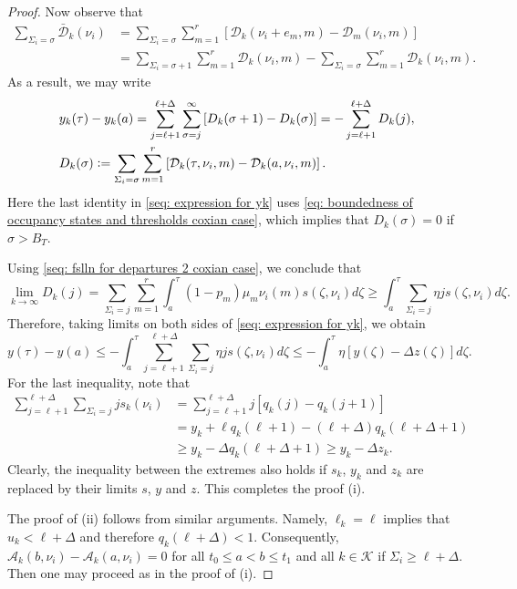\documentclass[a4paper, 12pt]{article}
\theoremstyle{definition}
\newcommand{\defeq}{\vcentcolon=}
\newcommand{\calA}{\mathcal{A}}
\newcommand{\calD}{\mathcal{D}}
\newcommand{\calK}{\mathcal{K}}
\begin{document}
\begin{proof}
Now observe that
\begin{align*}
	\sum_{\Sigma_i = \sigma} \bar{\calD}_k(\nu_i) &= \sum_{\Sigma_i = \sigma} \sum_{m = 1}^r \left[\calD_k(\nu_i + e_m, m) - \calD_m(\nu_i, m)\right] \\
	&= \sum_{\Sigma_i = \sigma + 1} \sum_{m = 1}^r \calD_k(\nu_i, m) - \sum_{\Sigma_i = \sigma} \sum_{m = 1}^r \calD_k(\nu_i, m).
\end{align*}
As a result, we may write
\begin{subequations}
	\begin{align}
		&y_k(\tau) - y_k(a) = \sum_{j = \ell + 1}^{\ell + \Delta} \sum_{\sigma = j}^\infty \left[D_k(\sigma + 1) - D_k(\sigma)\right] = - \sum_{j = \ell + 1}^{\ell + \Delta} D_k(j), \label{seq: expression for yk}\\
		&D_k(\sigma) \defeq \sum_{\Sigma_i = \sigma} \sum_{m = 1}^r \left[\calD_k(\tau, \nu_i, m) - \calD_k(a, \nu_i, m)\right].
	\end{align}
\end{subequations}
Here the last identity in \eqref{seq: expression for yk} uses \eqref{eq: boundedness of occupancy states and thresholds coxian case}, which implies that $D_k(\sigma) = 0$ if $\sigma > B_T$.

Using \eqref{seq: fslln for departures 2 coxian case}, we conclude that
\begin{equation*}
	\lim_{k \to \infty} D_k(j) = \sum_{\Sigma_i = j} \sum_{m = 1}^r \int_a^\tau (1 - p_m)\mu_m\nu_i(m)s(\zeta, \nu_i)d\zeta \geq \int_a^\tau \sum_{\Sigma_i = j} \eta j s(\zeta, \nu_i)d\zeta.
\end{equation*}
Therefore, taking limits on both sides of \eqref{seq: expression for yk}, we obtain
\begin{equation*}
	y(\tau) - y(a) \leq - \int_a^\tau \sum_{j = \ell + 1}^{\ell + \Delta} \sum_{\Sigma_i = j} \eta j s(\zeta, \nu_i)d\zeta \leq - \int_a^\tau \eta \left[y(\zeta) - \Delta z(\zeta)\right] d\zeta.
\end{equation*}
For the last inequality, note that
\begin{align*}
	\sum_{j = \ell + 1}^{\ell + \Delta} \sum_{\Sigma_i = j} js_k(\nu_i) &= \sum_{j = \ell + 1}^{\ell + \Delta} j\left[q_k(j) - q_k(j + 1)\right] \\
	&= y_k + \ell q_k(\ell + 1) - (\ell + \Delta) q_k(\ell + \Delta + 1) \\
	&\geq y_k - \Delta q_k(\ell + \Delta + 1) \geq y_k - \Delta z_k.
\end{align*}
Clearly, the inequality between the extremes also holds if $s_k$, $y_k$ and $z_k$ are replaced by their limits $s$, $y$ and $z$. This completes the proof (i).

The proof of (ii) follows from similar arguments. Namely, $\ell_k = \ell$ implies that $u_k < \ell + \Delta$ and therefore $q_k(\ell + \Delta) < 1$. Consequently, $\calA_k(b, \nu_i) - \calA_k(a, \nu_i) = 0$ for all $t_0 \leq a < b \leq t_1$ and all $k \in \calK$ if $\Sigma_i \geq \ell + \Delta$. Then one may proceed as in the proof of (i).
%
\end{proof}
\end{document}
